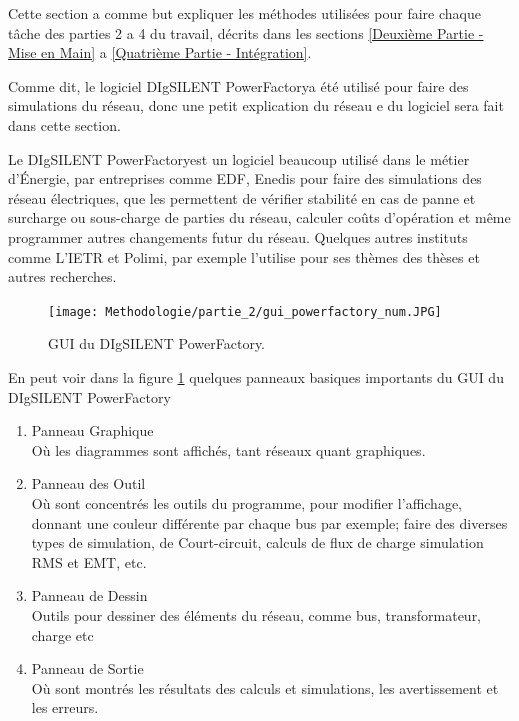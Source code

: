 Cette section a comme but expliquer les méthodes utilisées pour faire chaque tâche des parties 2 a 4 du travail, décrits dans les sections \ref{Deuxième Partie - Mise en Main} a \ref{Quatrième Partie - Intégration}.

\newcommand{\powerfactory}{DIgSILENT PowerFactory}
Comme dit, le logiciel \powerfactory a été utilisé pour faire des simulations du réseau, donc une petit explication du réseau e du logiciel sera fait dans cette section.

\mysubsubsection{À propos du \powerfactory}
Le \powerfactory est un logiciel beaucoup utilisé dans le métier d'Énergie, par entreprises comme \gls{EDF}, \gls{Enedis} pour faire des simulations des réseau électriques, que les permettent de vérifier stabilité en cas de panne et surcharge ou sous-charge de parties du réseau, calculer coûts d'opération et même programmer autres changements futur du réseau. Quelques autres instituts comme L'\gls{IETR} et \gls{Polimi}, par exemple l'utilise pour ses thèmes des thèses et autres recherches.   

\begin{figure}[H]
	\begin{center}	
		\texttt{[image: Methodologie/partie\_2/gui\_powerfactory\_num.JPG]}
		\caption{\gls{GUI} du \powerfactory.}
		\label{fig:gui_powerfactory}
	\end{center}
\end{figure}

\pagebreak
En peut voir dans la figure \ref{fig:gui_powerfactory} quelques panneaux basiques importants du \gls{GUI} du \powerfactory

\begin{enumerate}[I]
	\item Panneau Graphique\\ Où les diagrammes sont affichés, tant réseaux quant graphiques.
	\item Panneau des Outil\\ Où sont concentrés les outils du programme, pour modifier l'affichage, donnant une couleur différente par chaque bus par exemple; faire des diverses types de simulation,  de Court-circuit, calculs de flux de charge simulation \gls{RMS} et \gls{EMT}, etc.
	\item Panneau de Dessin\\ Outils pour dessiner des éléments du réseau, comme bus, transformateur, charge etc
	\item Panneau de Sortie\\ Où sont montrés les résultats des calculs et simulations, les avertissement et les erreurs.
\end{enumerate}


